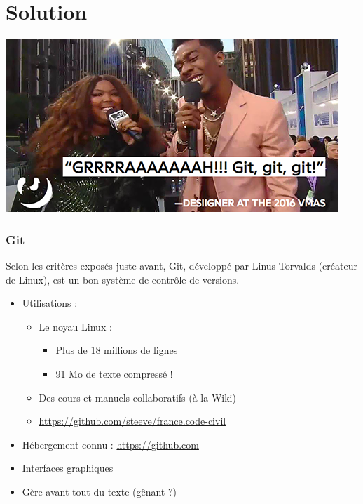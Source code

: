 \documentclass[compress]{beamer}
\begin{document}
\section{Solution}
\begin{frame}
	\center
	\includegraphics[width=\textwidth]{git-desiigner.png}
\end{frame}
\begin{frame}
	\frametitle{Git}
	Selon les critères exposés juste avant, Git,
	développé par Linus Torvalds (créateur de Linux),
	est un bon système de contrôle de versions. %

	\begin{itemize}
		\item Utilisations : \pause
			\begin{itemize}
				\item Le noyau Linux :
					\begin{itemize}
						\item Plus de 18 millions de lignes
						\item 91 Mo de texte compressé ! \pause
					\end{itemize}
				\item Des cours et manuels collaboratifs (à la Wiki) \pause
				\item \url{https://github.com/steeve/france.code-civil} \pause
			\end{itemize}
		\item Hébergement connu : \url{https://github.com} \pause
		\item Interfaces graphiques \pause
		\item Gère avant tout du texte (gênant ?)
	\end{itemize}
\end{frame}
\end{document}
